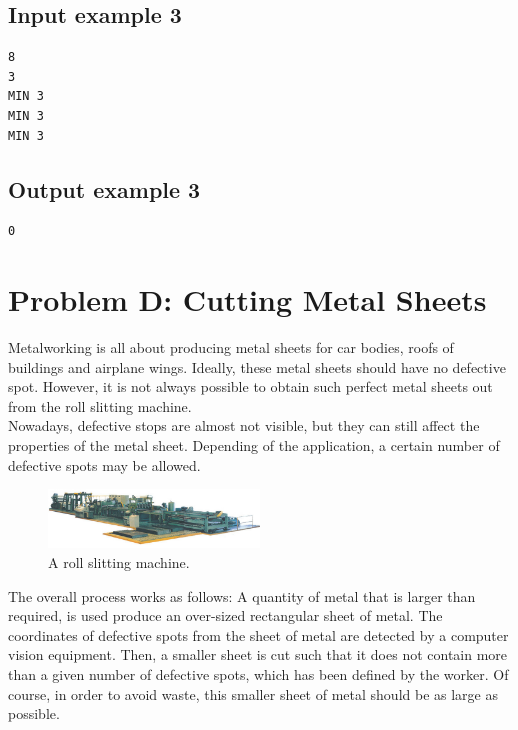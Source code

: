 \documentclass[11pt]{report}
\begin{document}
\subsection*{Input example 3}
\begin{verbatim}
8
3
MIN 3
MIN 3
MIN 3
\end{verbatim}

\subsection*{Output example 3}
\begin{verbatim}
0
\end{verbatim}

\clearpage

\section*{Problem D: Cutting Metal Sheets}

Metalworking is all about producing metal sheets for car bodies, roofs of buildings and airplane wings.
Ideally, these metal sheets should have no defective spot. However, it is not always possible
to obtain such perfect metal sheets out from the roll slitting machine.\\

Nowadays, defective stops are almost not visible, but they can still affect the properties of the metal sheet.
Depending of the application, a certain number of defective spots may be allowed.\\

\begin{figure}
  \centering
  \includegraphics[width=0.5\textwidth]{roll}
  \caption{A roll slitting machine.}
\end{figure}

The overall process works as follows: A quantity of metal that is larger than required, is used produce an over-sized rectangular
sheet of metal. The coordinates of defective spots from the sheet of metal are detected by a computer vision equipment.
Then, a smaller sheet is cut such that it does not contain more than a given number of defective spots, which has been defined
by the worker. Of course, in order to avoid waste, this smaller sheet of metal should be as large as possible.\\
\end{document}
